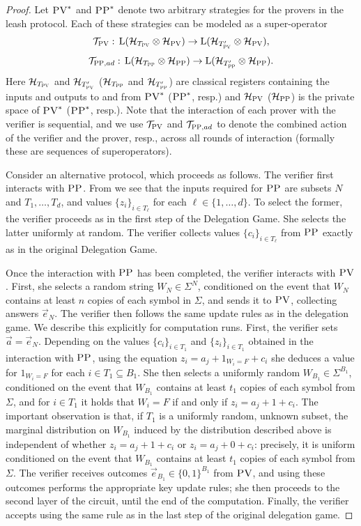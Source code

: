 \documentclass{toc}
\newcommand{\setft}[1]{\mathrm{#1}}
\newcommand{\Lin}{\setft{L}}
\newcommand{\mH}{\mathcal{H}}
\newcommand{\pv}{\textsc{PV}}
\newcommand{\pp}{\textsc{PP}}
\begin{document}
\begin{proof}
Let $\pv^*$ and $\pp^*$ denote two arbitrary strategies for the provers in the leash protocol. Each of these strategies can be modeled as a super-operator 
$$\mathcal{T}_\pv:\, \Lin(\mH_{T_\pv} \otimes \mH_\pv) \to \Lin(\mH_{T'_\pv} \otimes \mH_\pv),$$
$$\mathcal{T}_{\pp,ad}: \,\Lin(\mH_{T_\pp} \otimes \mH_\pp) \to \Lin(\mH_{T'_\pp} \otimes \mH_\pp).$$
Here $\mH_{T_\pv}$ and $\mH_{T'_\pv}$ %
($\mH_{T_\pp}$ and $\mH_{T'_\pp}$) are classical registers containing the inputs and outputs to and from $\pv^*$ %
($\pp^*$, resp.)
and $\mH_\pv$ %
($\mH_\pp$)  %
is the private space of $\pv^*$ %
($\pp^*$, resp.).  %
Note that the interaction of each prover with the verifier is sequential, and we use $\mathcal{T}_{\pv}$ and $\mathcal{T}_{\pp,ad}$ to denote the combined action of the verifier and the prover, resp., %
 across all rounds of interaction (formally these are sequences of superoperators).  %

Consider an alternative protocol, which proceeds as follows. The verifier first interacts with $\pp$. From  we see that the inputs required for $\pp$ are subsets $N$ and $T_1,\ldots,T_d$, and values $\{z_i\}_{i\in T_\ell}$ for each $\ell\in\{1,\ldots,d\}$. To select the former, the verifier proceeds as in the first step of the Delegation Game. She selects the latter uniformly at random. The verifier collects values $\{c_i\}_{i\in T_\ell}$ from $\pp$ exactly as in the original Delegation Game. 

Once the interaction with $\pp$ has been completed, the verifier interacts with $\pv$. First, she selects a random string $W_N\in \Sigma^N$, conditioned on the event that $W_N$ contains at least $n$ copies of each symbol in $\Sigma$, and sends it to $\pv$, collecting answers $\vec{e}_N$. The verifier then follows the same update rules as in the delegation game. We describe this explicitly for computation runs. First, the verifier sets $\vec{a} = \vec{e}_N$. Depending on the values $\{c_i\}_{i\in T_1}$ and $\{z_i\}_{i\in T_1}$ obtained in the interaction with $\pp$, using the equation $z_i = a_j + 1_{W_i=F}+c_i$ she deduces a value for $1_{W_i=F}$ for each $i\in T_1 \subseteq B_1$. She then selects a uniformly random $W_{B_1} \in \Sigma^{B_1}$, conditioned on the event that $W_{B_1}$ contains at least $t_1$ copies of each symbol from $\Sigma$, and for $i\in T_1$ it holds that $W_i=F$ if and only if $z_i = a_j + 1+c_i$. The important observation is that, if $T_1$ is a uniformly random, unknown subset, the marginal distribution on $W_{B_1}$ induced by the distribution described above is independent of whether $z_i = a_j + 1+c_i$ or $z_i = a_j + 0 +c_i$: precisely, it is uniform conditioned on the event that $W_{B_1}$ contains at least $t_1$ copies of each symbol from $\Sigma$. 
The verifier receives outcomes $\vec{e}_{B_1}\in \{0,1\}^{B_1}$ from $\pv$, and using these outcomes performs the appropriate key update rules; she then proceeds to the second layer of the circuit, until the end of the computation. Finally, the verifier accepts using the same rule as in the last step of the original delegation game. 


\end{proof}
\end{document}
